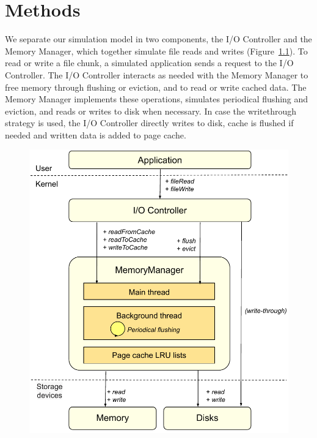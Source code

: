 \chapter{Methods}
\label{method}

We separate our simulation model in two components, the I/O
Controller and the Memory Manager, which together simulate
file reads and writes (Figure~\ref{fig:interaction}).
To read or write a file chunk, a simulated application sends a
request to the I/O Controller. The I/O Controller interacts as needed with
the Memory Manager to free memory through flushing or eviction,
and to read or write cached data. The Memory Manager
implements these operations, simulates periodical flushing
and eviction, and reads or writes to disk when necessary.
In case the writethrough strategy is used, the I/O Controller directly writes to disk, 
cache is flushed if needed and written data is added to page cache.

\begin{figure}
       \centering
       \includegraphics[width=0.8\columnwidth]{figures/interaction.pdf}
       \label{fig:interaction}
\end{figure}







